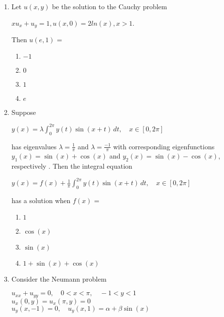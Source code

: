 \documentclass[journal]{IEEEtran}
\theoremstyle{remark}
\begin{document}
\begin{enumerate}
                \item Let $u(x,y)$ be the solution to the Cauchy problem 
                \begin{center}
                    $xu_x+u_y = 1, u(x,0) = 2 ln(x), x>1$.
                \end{center}
                Then $u(e,1)$ =
                \begin{multicols}{4}
                \begin{enumerate}
                    \item $-1$
                    \item $0$
                    \item $1$
                    \item $e$
                \end{enumerate}
                    
                \end{multicols}

                \item Suppose 
                \begin{center}
                   $ y(x) = \lambda \int_{0}^{2\pi} y(t) \sin(x+t) \, dt, \quad x \in [0, 2\pi]$
                \end{center}
                has eigenvalues $\lambda=\frac{1}{\pi}$ and $\lambda=\frac{-1}{\pi}$ with corresponding eigenfunctions $y_1(x)=\sin{(x)}+\cos{(x)}$ and $y_2(x)=\sin{(x)}-\cos{(x)}$, respectively . Then the integral equation 
                \begin{center}
                   $ y(x) = f(x) + \frac{1}{\pi} \int_{0}^{2\pi} y(t) \sin(x+t) \, dt, \quad x \in [0, 2\pi]$
                \end{center}
                has a solution when $f(x)$ =
                \begin{multicols}{2}
                \begin{enumerate}
                    \item $1$
                    \item $\cos{(x)}$
                    \item $\sin{(x)}$
                    \item $1+\sin{(x)}+\cos{(x)}$
                \end{enumerate}
                    
                \end{multicols}

                \item Consider the Neumann problem 
                \begin{center}
                    $u_{xx} + u_{yy} = 0, \quad 0 < x < \pi, \quad -1 < y < 1$\\
			$u_x(0, y) = u_x(\pi, y) = 0$\\
                    $u_y(x, -1) = 0, \quad u_y(x, 1) = \alpha + \beta \sin(x)$  


\end{center}
\end{enumerate}
\end{document}
